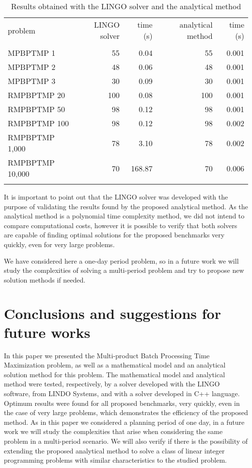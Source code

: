 \documentclass[authoryear,preprint,12pt]{elsarticle}
\begin{document}
\begin{table}[h]
\begin{center}
\begin{footnotesize}
\begin{tabular}[c]{l r r r r}
problem & LINGO solver & time (s) & analytical method & time (s) \\
\cline {1-5} \\
MPBPTMP 1 & 55 & 0.04 & 55 & 0.001 \\
MPBPTMP 2 & 48 & 0.06 & 48 & 0.001 \\
MPBPTMP 3 & 30 & 0.09 & 30 & 0.001 \\
RMPBPTMP 20 & 100 & 0.08 & 100 & 0.001 \\
RMPBPTMP 50 & 98 & 0.12 & 98 & 0.001\\
RMPBPTMP 100 & 98 & 0.12 & 98 & 0.002\\
RMPBPTMP 1,000 & 78 & 3.10 & 78 & 0.002\\
RMPBPTMP 10,000 & 70 & 168.87 & 70 & 0.006 \\
\cline {1-5} \\
\end{tabular}
\caption{Results obtained with the LINGO solver and the analytical method}
\label{tab:results}
\end{footnotesize}
\end{center}
\end{table}

It is important to point out that the LINGO solver was developed with the purpose of validating the results found by the proposed analytical method. As the analytical method is a polynomial time complexity method, we did not intend to compare computational costs, however it is possible to verify that both solvers are capable of finding optimal solutions for the proposed benchmarks very quickly, even for very large problems.

We have considered here a one-day period problem, so in a future work we will study the complexities of solving a multi-period problem and try to propose new solution methods if needed. 

\section{Conclusions and suggestions for future works}
\label{sec:conclusions}

In this paper we presented the Multi-product Batch Processing Time Maximization problem, as well as a mathematical model and an analytical solution method for this problem. The mathematical model and analytical method were tested, respectively, by a solver developed with the LINGO software, from LINDO Systems, and with a solver developed in C++ language. Optimum results were found for all proposed benchmarks, very quickly, even in the case of very large problems, which demonstrates the efficiency of the proposed method. As in this paper we considered a planning period of one day, in a future work we will study the complexities that arise when considering the same problem in a multi-period scenario. We will also verify if there is the possibility of extending the proposed analytical method to solve a class of linear integer programming problems with similar characteristics to the studied problem.
\end{document}
